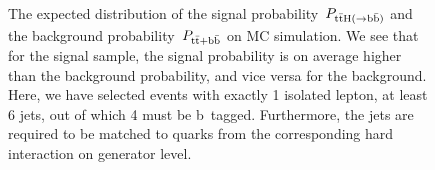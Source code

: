 \begin{figure}
\begin{centering}
\\
\caption[The distributions of the MEM signal and background probabilities]{The expected distribution of the signal probability~$P_{\mathrm{t} \bar{\mathrm{t}} \mathrm{H} (\rightarrow \mathrm{b}\bar{\mathrm{b}})}$ and the background probability~$P_{\mathrm{t} \bar{\mathrm{t}} + \mathrm{b}\bar{\mathrm{b}}}$ on MC simulation. We see that for the signal sample, the signal probability is on average higher than the background probability, and vice versa for the background. Here, we have selected events with exactly 1 isolated lepton, at least 6 jets, out of which 4 must be b~tagged. Furthermore, the jets are required to be matched to quarks from the corresponding hard interaction on generator level.}
\label{fig:mem_proba}
\end{centering}
\end{figure}

